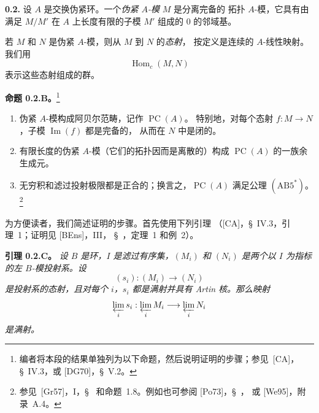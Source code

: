 
\medskip
\noindent\textbf{0.2.}
\label{sga3:VIIB:0.2}
设 \(A\) 是交换伪紧环。一个\emph{伪紧 \(A\)-模} \(M\) 是分离完备的
拓扑 \(A\)-模，它具有由满足 \(M/M'\) 在 \(A\) 上长度有限的子模
\(M'\) 组成的 \(0\) 的邻域基。

若 \(M\) 和 \(N\) 是伪紧 \(A\)-模，则从 \(M\) 到 \(N\) 的\emph{态射}，
按定义是连续的 \(A\)-线性映射。我们用
\[
  \operatorname{Hom}_c(M,N)
\]
表示这些态射组成的群。

\medskip
\noindent{}\textbf{命题 0.2.B。}\footnote{编者将本段的结果单独列为以下命题，然后说明证明的步骤；参见\ \textup{[CA]}，
\S~IV.3，或 \textup{[DG70]}，\S~V.2。}
\label{sga3:VIIB:0.2.B}
{\itshape
\begin{enumerate}
  \item[\textup{(i)}]
  伪紧 \(A\)-模构成阿贝尔范畴，记作 \(\operatorname{PC}(A)\)。
  特别地，对每个态射 \(f:M\to N\)，子模 \(\operatorname{Im}(f)\) 都是完备的，
  从而在 \(N\) 中是闭的。

  \item[\textup{(ii)}]
  有限长度的伪紧 \(A\)-模（它们的拓扑因而是离散的）构成
  \(\operatorname{PC}(A)\) 的一族余生成元。

  \item[\textup{\SGAInlineRefTarget{sga3:vii:proposition:0-2-b:item:iii}(iii)}]
  无穷积和滤过投射极限都是正合的；换言之，\(\operatorname{PC}(A)\)
  满足公理 \((\mathrm{AB}5^{*})\)。\footnote{参见\ \textup{[Gr57]}，I，\S~
  和命题~1.8。例如也可参阅 \textup{[Po73]}，\S~，
  或 \textup{[We95]}，附录~A.4。}
\end{enumerate}}

为方便读者，我们简述证明的步骤。首先使用下列引理
（\textup{[CA]}，\S~IV.3，引理~1；证明见 \textup{[BEns]}，III，
\S~，定理~1 和例~2）。

\medskip
\noindent\textbf{引理 0.2.C。}
\label{sga3:VIIB:0.2.C}
\textit{设 \(B\) 是环，\(I\) 是滤过有序集，\((M_i)\) 和 \((N_i)\)
是两个以 \(I\) 为指标的左 \(B\)-模投射系。设
\[
  (s_i):(M_i)\longrightarrow(N_i)
\]
是投射系的态射，且对每个 \(i\)，\(s_i\) 都是满射并具有 Artin 核。那么映射}
\[
  \varprojlim_i s_i:
  \varprojlim_i M_i
  \longrightarrow
  \varprojlim_i N_i
\]
\textit{是满射。}

